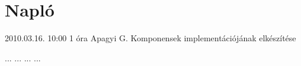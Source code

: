 %
\section{Napló}

\begin{naplo}

\bejegyzes
{2010.03.16. 10:00} %
{1 óra} %
{Apagyi G.} %
{Komponensek implementációjának elkészítése} %


\bejegyzes
{...}
{...}
{...}
{...}


\end{naplo}

